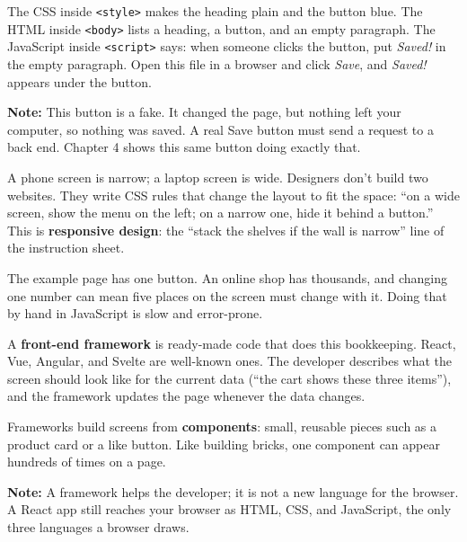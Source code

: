 \noindent{}The CSS inside \texttt{\textless{}style\textgreater{}} makes the heading plain and the button blue. The HTML inside \texttt{\textless{}body\textgreater{}} lists a heading, a button, and an empty paragraph. The JavaScript inside \texttt{\textless{}script\textgreater{}} says: when someone clicks the button, put \emph{Saved!} in the empty paragraph. Open this file in a browser and click \emph{Save}, and \emph{Saved!} appears under the button.

\begin{notebox}

\textbf{Note:} This button is a fake. It changed the page, but nothing left your computer, so nothing was saved. A real Save button must send a request to a back end. Chapter 4 shows this same button doing exactly that.

\end{notebox}

\label{webapp-02:one-page-every-screen}

A phone screen is narrow; a laptop screen is wide. Designers don't build two websites. They write CSS rules that change the layout to fit the space: ``on a wide screen, show the menu on the left; on a narrow one, hide it behind a button.'' This is \textbf{responsive design}: the ``stack the shelves if the wall is narrow'' line of the instruction sheet.

\label{webapp-02:front-end-frameworks}

The example page has one button. An online shop has thousands, and changing one number can mean five places on the screen must change with it. Doing that by hand in JavaScript is slow and error-prone.

A \textbf{front-end framework} is ready-made code that does this bookkeeping. React, Vue, Angular, and Svelte are well-known ones. The developer describes what the screen should look like for the current data (``the cart shows these three items''), and the framework updates the page whenever the data changes.

Frameworks build screens from \textbf{components}: small, reusable pieces such as a product card or a like button. Like building bricks, one component can appear hundreds of times on a page.

\begin{notebox}

\textbf{Note:} A framework helps the developer; it is not a new language for the browser. A React app still reaches your browser as HTML, CSS, and JavaScript, the only three languages a browser draws.

\end{notebox}

